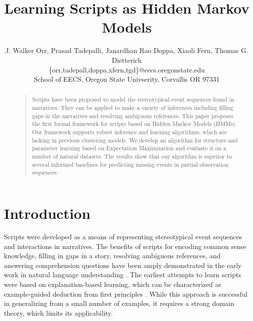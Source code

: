 \documentclass[letterpaper]{article}
\begin{document}
\title{Learning Scripts as Hidden Markov Models}
\author{J. Walker Orr, Prasad Tadepalli, Janardhan Rao Doppa, Xiaoli Fern, Thomas G. Dietterich \\ \{orr,tadepall,doppa,xfern,tgd\}@eecs.oregonstate.edu \\School of EECS, Oregon State Univserity, Corvallis OR 97331}
\maketitle
\begin{abstract}
\begin{quote}
Scripts have been proposed to model the stereotypical event sequences found in
narratives. They can be applied to make a variety of inferences including filling
gaps in the narratives and resolving ambiguous references. This paper proposes
the first formal framework for scripts based on Hidden Markov Models (HMMs). Our
framework supports robust inference and learning algorithms, which are lacking in
previous clustering models. We develop an algorithm for structure and parameter
learning based on Expectation Maximization and evaluate it on a number of natural
datasets. The results show that our algorithm is superior to
several informed baselines for predicting missing
events in partial observation sequences.

\end{quote}
\end{abstract}

\section{Introduction}
Scripts were developed as a means of representing stereotypical event sequences and interactions in narratives. %
The benefits of scripts for encoding common sense knowledge,
filling in gaps in a story, resolving
ambiguous references, and answering comprehension
questions have been amply demonstrated in the early work
in natural language understanding \cite{schank1977scripts}.
The earliest attempts to learn scripts were based on
 explanation-based learning, which can be characterized as example-guided deduction from first principles \cite{dejong1981,dejong1986EBL}. %
While this approach is successful in generalizing from a small number of examples, it requires a strong domain theory, which limits its applicability.
\end{document}
